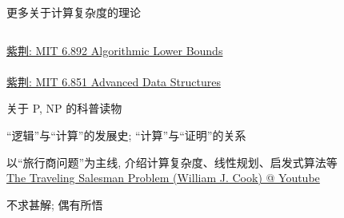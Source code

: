 \begin{frame}{}

  \vspace{0.30cm}
  \begin{center}
	更多关于计算复杂度的理论
  \end{center}
\end{frame}

\begin{frame}{}
  \begin{columns}
  \end{columns}

  \vspace{0.50cm}
  \begin{center}
    \href{http://zijingbt.njuftp.org/stats.html?id=111446}{紫荆: MIT 6.892 Algorithmic Lower Bounds} \\[3pt]
	 \\[6pt]
	\href{http://zijingbt.njuftp.org/stats.html?id=111445}{紫荆: MIT 6.851 Advanced Data Structures} \\[3pt]
  \end{center}
\end{frame}

\begin{frame}{}

  \begin{center}
	关于 P, NP 的科普读物
  \end{center}
\end{frame}

\begin{frame}

  \begin{center}
	``逻辑''与``计算''的发展史; ``计算''与``证明''的关系
  \end{center}
\end{frame}

\begin{frame}

  \begin{center}
	以``旅行商问题''为主线, 介绍计算复杂度、线性规划、启发式算法等 \\[10pt]

	\href{https://youtu.be/dsLgPlUWN4U}{The Traveling Salesman Problem (William J. Cook) @ Youtube}
  \end{center}
\end{frame}

\begin{frame}

  \begin{center}
	不求甚解; 偶有所悟
  \end{center}
\end{frame}
